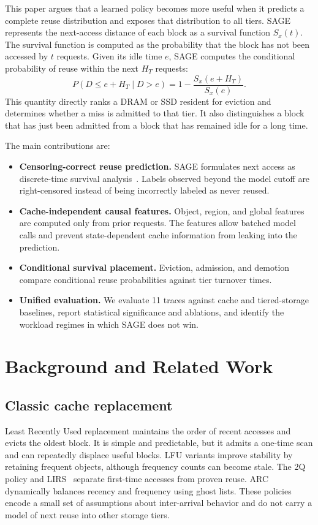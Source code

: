 \documentclass[conference]{IEEEtran}
\begin{document}
This paper argues that a learned policy becomes more useful when it predicts a complete reuse distribution and exposes that distribution to all tiers. SAGE represents the next-access distance of each block as a survival function $S_x(t)$. The survival function is computed as the probability that the block has not been accessed by $t$ requests. Given its idle time $e$, SAGE computes the conditional probability of reuse within the next $H_T$ requests:
\[
P(D \leq e+H_T \mid D>e)
=1-\frac{S_x(e+H_T)}{S_x(e)}.
\]
This quantity directly ranks a DRAM or SSD resident for eviction and determines whether a miss is admitted to that tier. It also distinguishes a block that has just been admitted from a block that has remained idle for a long time.

The main contributions are:
\begin{itemize}
\item \textbf{Censoring-correct reuse prediction.} SAGE formulates next access as discrete-time survival analysis~\cite{singer}. Labels observed beyond the model cutoff are right-censored instead of being incorrectly labeled as never reused.
\item \textbf{Cache-independent causal features.} Object, region, and global features are computed only from prior requests. The features allow batched model calls and prevent state-dependent cache information from leaking into the prediction.
\item \textbf{Conditional survival placement.} Eviction, admission, and demotion compare conditional reuse probabilities against tier turnover times.
\item \textbf{Unified evaluation.} We evaluate 11 traces against cache and tiered-storage baselines, report statistical significance and ablations, and identify the workload regimes in which SAGE does not win.
\end{itemize}

\section{Background and Related Work}
\subsection{Classic cache replacement}
Least Recently Used replacement maintains the order of recent accesses and evicts the oldest block. It is simple and predictable, but it admits a one-time scan and can repeatedly displace useful blocks. LFU variants improve stability by retaining frequent objects, although frequency counts can become stale. The 2Q policy and LIRS~\cite{lirs} separate first-time accesses from proven reuse. ARC~\cite{arc} dynamically balances recency and frequency using ghost lists. These policies encode a small set of assumptions about inter-arrival behavior and do not carry a model of next reuse into other storage tiers.
\end{document}
